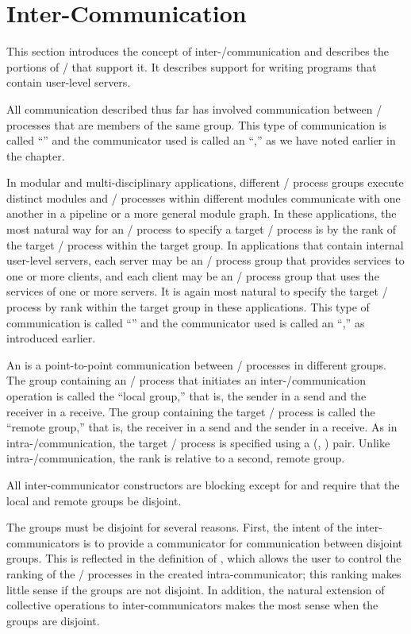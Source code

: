 \section{Inter-Communication}
\label{sec:context-intercom}
This section introduces the concept of inter\hyphen/communication and
describes the portions of \MPI/ that support it. It describes support for
writing programs that contain user-level servers.

All communication described thus far has involved
communication between \MPI/ processes that are members of the same group. This type
of communication is called ``'' and the
communicator used is called an ``,'' as we have noted
earlier in the chapter.

In modular and multi-disciplinary applications, different \MPI/ process groups
execute distinct modules and \MPI/ processes within different modules communicate
with one another in a pipeline or a more general module graph. In these
applications, the most natural way for an \MPI/ process to specify a target \MPI/ process
is by the rank of the target \MPI/ process within the target group. In applications
that contain internal user-level servers, each server may be an \MPI/ process group
that provides services to one or more clients, and each client may be an
\MPI/ process group that uses the services of one or more servers. It is again most
natural to specify the target \MPI/ process by rank within the target group in these
applications. This type of communication is called
``'' and the communicator used is called an
``,'' as introduced earlier.

An  is a point-to-point communication
between \MPI/ processes in different groups. The group containing an \MPI/ process that
initiates an inter\hyphen/communication operation is called the ``local
group,'' that is, the sender in a send and the receiver in a receive. The
group containing the target \MPI/ process is called the ``remote group,'' that is,
the receiver in a send and the sender in a receive. As in
intra\hyphen/communication, the target \MPI/ process is specified using a
(, ) pair. Unlike intra\hyphen/communication, the
rank is relative to a second, remote group.

All inter-communicator constructors are blocking
except for  and
require that the local and remote groups be disjoint.
\begin{users}
  The groups must be disjoint for several reasons. First, the intent of the
  inter-communicators is to provide a communicator for communication between
  disjoint groups. This is reflected in the
  definition of , which allows the user to
  control the ranking of the \MPI/ processes in the created intra-communicator;
  this ranking makes little sense if the groups are not disjoint. In
  addition, the natural extension of collective operations to
  inter-communicators makes the most sense when
  the groups are disjoint.
\end{users}



